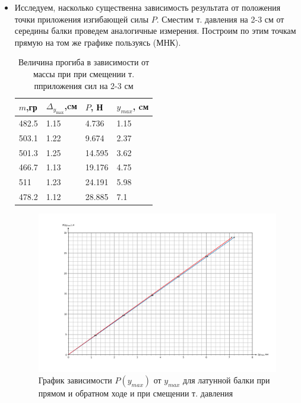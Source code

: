 \documentclass[a4paper,12pt]{article} %
\begin{document}
\begin{itemize}
    \item Исследуем, насколько существенна зависимость результата от положения точки 
приложения изгибающей силы $P$. Сместим т. давления на 2-3 см от середины балки 
проведем аналогичные измерения. Построим по этим точкам прямую на том же графике пользуясь (МНК).

\begin{table}[!h]
    \begin{center}
    \begin{tabular}{|l|l|l|l|} \hline
    $m$,гр & $\Delta_{y_{\text{max}}}$,cм & $P$, Н   & $y_{max}$, cм \\ \hline
    482.5 & 1.15 & 4.736  & 1.15 \\ \hline
    503.1 & 1.22 & 9.674  & 2.37 \\ \hline 
    501.3 & 1.25 & 14.595 & 3.62 \\ \hline
    466.7 & 1.13 & 19.176 & 4.75 \\ \hline
    511   & 1.23 & 24.191 & 5.98 \\ \hline
    478.2 & 1.12 & 28.885 & 7.1 \\ \hline
    \end{tabular}
    \caption{Величина прогиба в зависимости от массы при при смещении т. пприложения сил на 2-3 см}
    \end{center}
\end{table}

\begin{figure}[!h]
    \begin{center}
        \includegraphics[width=1\textwidth]{pictures/graphic12b.png}
        \caption{График зависимости $P(y_{max})$ от $y_{max}$ для латунной балки при прямом и обратном ходе и при смещении т. давления}
        \label{graphic1yyyb}
    \end{center}
\end{figure}


\end{itemize}
\end{document}
